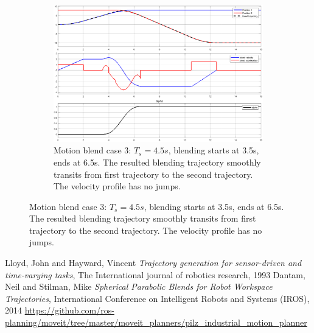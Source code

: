 \documentclass{article}
\begin{document}
\begin{figure}[ht]
	\begin{subfigure}[ht]{0.8\textwidth}%
		\centering
		\includegraphics[width=0.8\columnwidth]{figure/blend_case_3.eps}%
		\caption{Motion blend case 3: $T_s = 4.5s$, blending starts at 3.5s, ends at 6.5s. The resulted blending trajectory smoothly transits from first trajectory to the second trajectory. The velocity profile has no jumps.}%
		\label{blend_case_3}%
	\end{subfigure}
	
\end{figure}


\begin{thebibliography}{9}
Lloyd, John and Hayward, Vincent \textit{Trajectory generation for sensor-driven and time-varying tasks}, The International journal of robotics research, 1993
Dantam, Neil and Stilman, Mike \textit{Spherical Parabolic Blends for Robot Workspace Trajectories}, International Conference on Intelligent Robots and Systems (IROS), 2014
\url{https://github.com/ros-planning/moveit/tree/master/moveit_planners/pilz_industrial_motion_planner}
\end{thebibliography}
\end{document}
